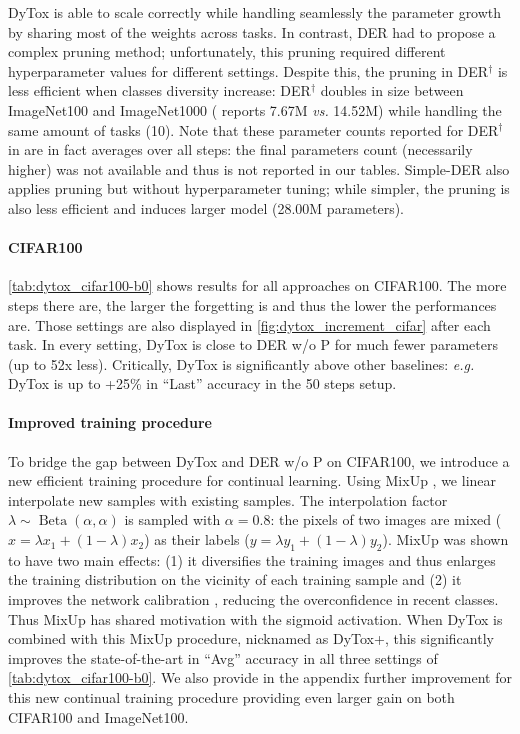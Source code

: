 DyTox is able to scale correctly while handling seamlessly the parameter growth by sharing most of
the weights across tasks. In contrast, DER had to propose a complex pruning method; unfortunately,
this pruning required different hyperparameter values for different settings. Despite this, the
pruning in DER$^\dagger$ is less efficient when classes diversity increase: DER$^\dagger$ doubles in
size between ImageNet100 and ImageNet1000 (\cite{yan2021der} reports 7.67M \textit{vs.} 14.52M)
while handling the same amount of tasks (10). Note that these parameter counts reported for
DER$^\dagger$ in \cite{yan2021der} are in fact averages over all steps: the final parameters count
(necessarily higher) was not available and thus is not reported in our tables. Simple-DER also
applies pruning but without hyperparameter tuning; while simpler, the pruning is also less efficient
and induces larger model (28.00M parameters).

\vspace{-0.5em}
\paragraph{CIFAR100} \autoref{tab:dytox_cifar100-b0} shows results for all approaches on CIFAR100. The
more steps there are, the larger the forgetting is and thus the lower the performances are. Those
settings are also displayed in \autoref{fig:dytox_increment_cifar} after each task. In every setting,
DyTox is close to DER w/o P  for much fewer parameters (up to 52x less). Critically, DyTox is
significantly above other baselines: \textit{e.g.} DyTox is up to +25\% in ``Last'' accuracy in the
50 steps setup.

\vspace{-1em}
\paragraph{Improved training procedure} To bridge the gap between DyTox and DER w/o P on CIFAR100,
we introduce a new efficient training procedure for continual learning. Using MixUp
\cite{hingyi2018mixup}, we linear interpolate new samples with existing samples. The interpolation
factor $\lambda \sim \operatorname{Beta}(\alpha, \alpha)$ is sampled with $\alpha=0.8$: the pixels
of two images are mixed ($x = \lambda x_1 + (1 - \lambda) x_2$) as their labels ($y = \lambda y_1 +
    (1 - \lambda) y_2$). MixUp was shown to have two main effects: (1) it diversifies the training
images and thus enlarges the training distribution on the vicinity of each training sample
\cite{chapelle2001vicinalrisk} and (2) it improves the network calibration
\cite{guo2017miscalibration,thulasidasan2019mixupcalibration}, reducing the overconfidence in recent
classes. Thus MixUp has shared motivation with the sigmoid activation. When DyTox is combined with
this MixUp procedure, nicknamed as DyTox+, this significantly improves the state-of-the-art in
``Avg'' accuracy in all three settings of \autoref{tab:dytox_cifar100-b0}. We also provide in the appendix
further improvement for this new continual training procedure providing even larger gain on both
CIFAR100 and ImageNet100.

